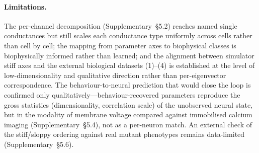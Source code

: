 \documentclass[11pt]{article}
\begin{document}
\paragraph{Limitations.} The per-channel decomposition (Supplementary~\S5.2) reaches named single conductances but still scales each conductance type uniformly across cells rather than cell by cell; the mapping from parameter axes to biophysical classes is biophysically informed rather than learned; and the alignment between simulator stiff axes and the external biological datasets (1)--(4) is established at the level of low-dimensionality and qualitative direction rather than per-eigenvector correspondence. The behaviour-to-neural prediction that would close the loop is confirmed only qualitatively---behaviour-recovered parameters reproduce the gross statistics (dimensionality, correlation scale) of the unobserved neural state, but in the modality of membrane voltage compared against immobilised calcium imaging (Supplementary~\S5.4), not as a per-neuron match. An external check of the stiff/sloppy ordering against real mutant phenotypes remains data-limited (Supplementary~\S5.6).

\end{document}
